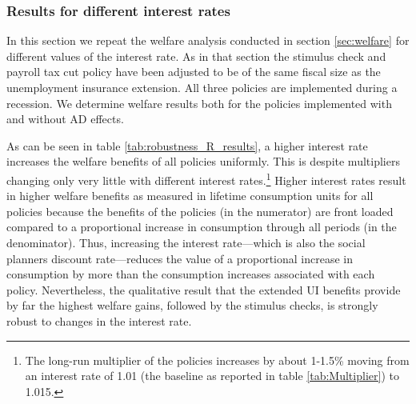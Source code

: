 \documentclass[../HAFiscal]{subfiles}
\begin{document}
\subsubsection{Results for different interest rates}
\label{sec:robust_R_results}

In this section we repeat the welfare analysis conducted in section \ref{sec:welfare} for different values of the interest rate. As in that section the stimulus check and payroll tax cut policy have been adjusted to be of the same fiscal size as the unemployment insurance extension. All three policies are implemented during a recession. We determine welfare results both for the policies implemented with and without AD effects.

As can be seen in table \ref{tab:robustness_R_results}, a higher interest rate increases the welfare benefits of all policies uniformly. This is despite multipliers changing only very little with different interest rates.\footnote{The long-run multiplier of the policies increases by about 1-1.5\% moving from an interest rate of 1.01 (the baseline as reported in table \ref{tab:Multiplier}) to 1.015.} Higher interest rates result in higher welfare benefits as measured in lifetime consumption units for all policies because the benefits of the policies (in the numerator) are front loaded compared to a proportional increase in consumption through all periods (in the denominator). Thus, increasing the interest rate---which is also the social planners discount rate---reduces the value of a proportional increase in consumption by more than the consumption increases associated with each policy.  Nevertheless, the qualitative result that the extended UI benefits provide by far the highest welfare gains, followed by the stimulus checks, is strongly robust to changes in the interest rate.
\end{document}
